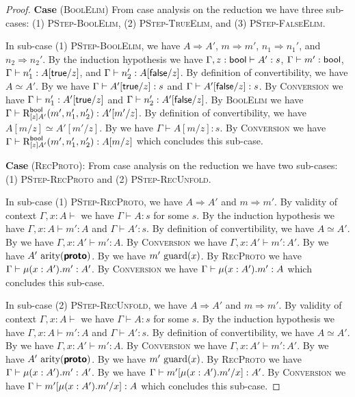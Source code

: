 \begin{proof}
\textbf{Case} (\textsc{BoolElim})
  From case analysis on the reduction we have three sub-cases:
  (1) \textsc{PStep-BoolElim}, (2) \textsc{PStep-TrueElim}, and (3) \textsc{PStep-FalseElim}.

  In sub-case (1) \textsc{PStep-BoolElim}, we have 
  $A \Rightarrow A'$, $m \Rightarrow m'$, $n_1 \Rightarrow n_1'$, and $n_2 \Rightarrow n_2'$.
  By the induction hypothesis we have
  $\Gamma, z : \textsf{bool} \vdash A' : s$, 
  $\Gamma \vdash m' : \textsf{bool}$, 
  $\Gamma \vdash n_1' : A[\textsf{true}/z]$, and 
  $\Gamma \vdash n_2' : A[\textsf{false}/z]$.
  By definition of convertibility, we have $A \simeq A'$.
  By  we have $\Gamma \vdash A'[\textsf{true}/z] : s$ and $\Gamma \vdash A'[\textsf{false}/z] : s$.
  By \textsc{Conversion} we have $\Gamma \vdash n_1' : A'[\textsf{true}/z]$ and $\Gamma \vdash n_2' : A'[\textsf{false}/z]$.
  By \textsc{BoolElim} we have $\Gamma \vdash \text{R}_{[z]A'}^{\textsf{bool}}({m'},{n_1'},{n_2'}) : A'[m'/z]$.
  By definition of convertibility, we have $A[m/z] \simeq A'[m'/z]$.
  By  we have $\Gamma \vdash A[m/z] : s$.
  By \textsc{Conversion} we have $\Gamma \vdash \text{R}_{[z]A'}^{\textsf{bool}}({m'},{n_1'},{n_2'}) : A[m/z]$ which concludes this sub-case.

\textbf{Case} (\textsc{RecProto}):
  From case analysis on the reduction we have two sub-cases:
  (1) \textsc{PStep-RecProto} and (2) \textsc{PStep-RecUnfold}.

  In sub-case (1) \textsc{PStep-RecProto}, we have $A \Rightarrow A'$ and $m \Rightarrow m'$.
  By validity of context $\Gamma, x : A \vdash$ we have $\Gamma \vdash A : s$ for some $s$.
  By the induction hypothesis we have ${\Gamma, x : A \vdash m' : A}$ and ${\Gamma \vdash A' : s}$.
  By definition of convertibility, we have $A \simeq A'$.
  By  we have $\Gamma, x : A' \vdash m' : A$.
  By \textsc{Conversion} we have $\Gamma, x : A' \vdash m' : A'$.
  By  we have $A'~\text{arity}(\textbf{\textsf{proto}})$.
  By  we have $m'~\text{guard}(x)$.
  By \textsc{RecProto} we have $\Gamma \vdash \mu({x : A'}).{m'} : A'$.
  By \textsc{Conversion} we have $\Gamma \vdash \mu({x : A'}).{m'} : A$ which concludes this sub-case.

  In sub-case (2) \textsc{PStep-RecUnfold}, we have $A \Rightarrow A'$ and $m \Rightarrow m'$.
  By validity of context $\Gamma, x : A \vdash$ we have $\Gamma \vdash A : s$ for some $s$.
  By the induction hypothesis we have ${\Gamma, x : A \vdash m' : A}$ and ${\Gamma \vdash A' : s}$.
  By definition of convertibility, we have $A \simeq A'$.
  By  we have $\Gamma, x : A' \vdash m' : A$.
  By \textsc{Conversion} we have $\Gamma, x : A' \vdash m' : A'$.
  By  we have $A'~\text{arity}(\textbf{\textsf{proto}})$.
  By  we have $m'~\text{guard}(x)$.
  By \textsc{RecProto} we have $\Gamma \vdash \mu({x : A'}).{m'} : A'$.
  By  we have $\Gamma \vdash m'[\mu({x : A'}).{m'}/x] : A'$.
  By \textsc{Conversion} we have $\Gamma \vdash m'[\mu({x : A'}).{m'}/x] : A$ which concludes this sub-case.
\end{proof}